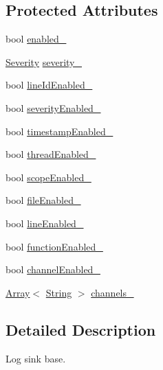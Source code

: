 \subsection*{Protected Attributes}
\begin{DoxyCompactItemize}
\item 
bool \hyperlink{classlibrary_1_1core_1_1logger_1_1sinks_1_1Sink_ac1386fd47307e8956c345b5ec5725c8f}{enabled\+\_\+}
\item 
\hyperlink{namespacelibrary_1_1core_1_1logger_a35f71353edf64f68f7fe3874b01abaa8}{Severity} \hyperlink{classlibrary_1_1core_1_1logger_1_1sinks_1_1Sink_a49cd9c83a41cde12c4b0f5431c0e1b41}{severity\+\_\+}
\item 
bool \hyperlink{classlibrary_1_1core_1_1logger_1_1sinks_1_1Sink_a75d2b3e0a9551cd8788e3d9c320d79dd}{line\+Id\+Enabled\+\_\+}
\item 
bool \hyperlink{classlibrary_1_1core_1_1logger_1_1sinks_1_1Sink_af54f11a79fe19b15f2bc2f3783d382ba}{severity\+Enabled\+\_\+}
\item 
bool \hyperlink{classlibrary_1_1core_1_1logger_1_1sinks_1_1Sink_afebb8b5eef5abf365943cd10caf23bab}{timestamp\+Enabled\+\_\+}
\item 
bool \hyperlink{classlibrary_1_1core_1_1logger_1_1sinks_1_1Sink_abf1a3577855cc40b5075b4d73a3c86a2}{thread\+Enabled\+\_\+}
\item 
bool \hyperlink{classlibrary_1_1core_1_1logger_1_1sinks_1_1Sink_abffe5eb81e1eb858eaad2cc806b3806b}{scope\+Enabled\+\_\+}
\item 
bool \hyperlink{classlibrary_1_1core_1_1logger_1_1sinks_1_1Sink_a8691bad7f4c73aa394901e6e10b5fe47}{file\+Enabled\+\_\+}
\item 
bool \hyperlink{classlibrary_1_1core_1_1logger_1_1sinks_1_1Sink_a00b45879a45459f44475eab2618b30f9}{line\+Enabled\+\_\+}
\item 
bool \hyperlink{classlibrary_1_1core_1_1logger_1_1sinks_1_1Sink_acb68b94fd8745d1e06d1cc1f2caa2e73}{function\+Enabled\+\_\+}
\item 
bool \hyperlink{classlibrary_1_1core_1_1logger_1_1sinks_1_1Sink_a48307be32eede5359f345b54363070ae}{channel\+Enabled\+\_\+}
\item 
\hyperlink{classlibrary_1_1core_1_1ctnr_1_1Array}{Array}$<$ \hyperlink{classlibrary_1_1core_1_1types_1_1String}{String} $>$ \hyperlink{classlibrary_1_1core_1_1logger_1_1sinks_1_1Sink_a3ba1eb6372e9bf6d2d8b3ff53d529021}{channels\+\_\+}
\end{DoxyCompactItemize}


\subsection{Detailed Description}
Log sink base. 

